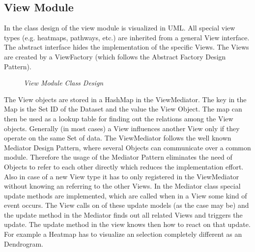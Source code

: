 \subsection{View Module}

In  the class design of the view module is visualized in UML.
All special view types (e.g. heatmaps, pathways, etc.) are inherited from a general View interface.
The abstract interface hides the implementation of the specific Views.
The Views are created by a ViewFactory (which follows the Abstract Factory Design Pattern).

\begin{figure}[ht]
\centering
{} 
\caption[View Module Class Design]{\textit{View Module Class Design}} 
\label{gfx:view_module_class_design}
\end{figure}

The View objects are stored in a HashMap in the ViewMediator. The key in the Map is the Set ID of the Dataset and the value the View Object. The map can then be used as a lookup table for finding out the relations among the View objects. Generally (in most cases) a View influences another View only if they operate on the same Set of data. 
The ViewMediator follows the well known Mediator Design Pattern, where several Objects can communicate over a common module.
Therefore the usage of the Mediator Pattern eliminates the need of Objects to refer to each other directly which reduces the implementation effort. Also in case of a new View type it has to only registered in the ViewMediator without knowing an referring to the other Views. In the Mediator class special update methods are implemented, which are called when in a View some kind of event occurs. The View calls on of these update models (as the case may be) and the update method in the Mediator finds out all related Views and triggers the update. The update method in the view knows then how to react on that update. For example a Heatmap has to visualize an selection completely different as an Dendrogram.

